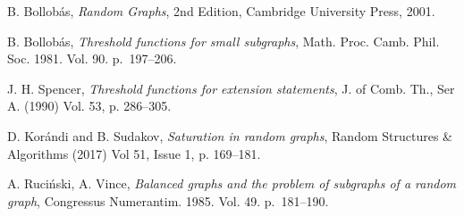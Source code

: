 \documentclass[]{article}
\begin{document}
\begin{thebibliography}{99}

 B. Bollob\'{a}s, {\it Random Graphs}, 2nd Edition, Cambridge University Press, 2001.

 B. Bollob\'{a}s, {\it Threshold functions for small subgraphs}, Math. Proc. Camb. Phil. Soc. 1981. Vol. 90. p.~197--206.


 J. H. Spencer, {\it Threshold functions for extension statements},  J. of Comb. Th., Ser A. (1990) Vol. 53, p. 286--305.

  D. Kor\'{a}ndi and B. Sudakov, {\it Saturation in random graphs},  Random Structures \& Algorithms (2017) Vol 51, Issue 1, p. 169--181.

 A. Ruci\'{n}ski, A. Vince, {\it Balanced graphs and the problem of subgraphs of a random graph}, Congressus Numerantim. 1985. Vol. 49. p.~181--190.




\end{thebibliography}






 
\end{document}
